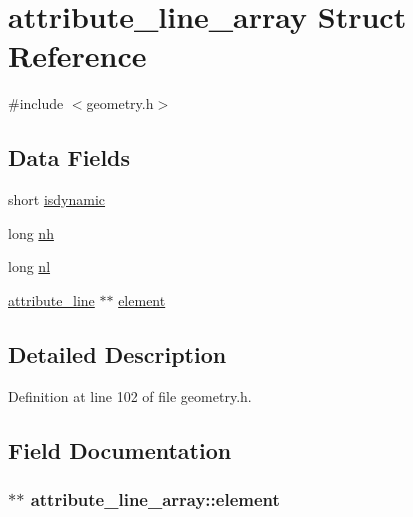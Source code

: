 \hypertarget{structattribute__line__array}{\section{attribute\-\_\-line\-\_\-array Struct Reference}
\label{structattribute__line__array}
}


{\ttfamily \#include $<$geometry.\-h$>$}

\subsection*{Data Fields}
\begin{DoxyCompactItemize}
\item 
short \hyperlink{structattribute__line__array_a389f0a5f9f8ffbb1b6079faadf0e062f}{isdynamic}
\item 
long \hyperlink{structattribute__line__array_ae263914bf906dafb857886a22e8db713}{nh}
\item 
long \hyperlink{structattribute__line__array_acf5ef21f87424c806de30fce6bb09544}{nl}
\item 
\hyperlink{geometry_8h_a9c531e67250fde0f671db16114f9f4dc}{attribute\-\_\-line} $\ast$$\ast$ \hyperlink{structattribute__line__array_a43df46fe0e227c00de608f1c4161dbd7}{element}
\end{DoxyCompactItemize}


\subsection{Detailed Description}


Definition at line 102 of file geometry.\-h.



\subsection{Field Documentation}
\hypertarget{structattribute__line__array_a43df46fe0e227c00de608f1c4161dbd7}{
\subsubsection[{element}]{$\ast$$\ast$ attribute\-\_\-line\-\_\-array\-::element}}\label{structattribute__line__array_a43df46fe0e227c00de608f1c4161dbd7}


